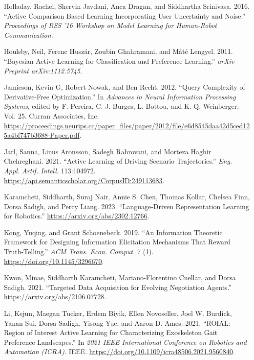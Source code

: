 \documentclass[
  letterpaper,
  numbers=noenddot,
  DIV=11,
  oneside]{scrreprt}
\newlength{\cslhangindent}
\newenvironment{CSLReferences}[2] %
 {\begin{list}{}{%
  \setlength{\itemindent}{0pt}
  \setlength{\leftmargin}{0pt}
  \setlength{\parsep}{0pt}
  \ifodd #1
   \setlength{\leftmargin}{\cslhangindent}
   \setlength{\itemindent}{-1\cslhangindent}
  \fi
  \setlength{\itemsep}{#2\baselineskip}}}
 {\end{list}}
\theoremstyle{remark}
\begin{document}
\begin{CSLReferences}{1}{0}
Holladay, Rachel, Shervin Javdani, Anca Dragan, and Siddhartha
Srinivasa. 2016. {``Active Comparison Based Learning Incorporating User
Uncertainty and Noise.''} \emph{Proceedings of RSS '16 Workshop on Model
Learning for Human-Robot Communication}.

Houlsby, Neil, Ferenc Huszár, Zoubin Ghahramani, and Máté Lengyel. 2011.
{``Bayesian Active Learning for Classification and Preference
Learning.''} \emph{arXiv Preprint arXiv:1112.5745}.

Jamieson, Kevin G, Robert Nowak, and Ben Recht. 2012. {``Query
Complexity of Derivative-Free Optimization.''} In \emph{Advances in
Neural Information Processing Systems}, edited by F. Pereira, C. J.
Burges, L. Bottou, and K. Q. Weinberger. Vol. 25. Curran Associates,
Inc.
\url{https://proceedings.neurips.cc/paper_files/paper/2012/file/e6d8545daa42d5ced125a4bf747b3688-Paper.pdf}.

Jarl, Sanna, Linus Aronsson, Sadegh Rahrovani, and Morteza Haghir
Chehreghani. 2021. {``Active Learning of Driving Scenario
Trajectories.''} \emph{Eng. Appl. Artif. Intell.} 113:104972.
\url{https://api.semanticscholar.org/CorpusID:249113683}.

Karamcheti, Siddharth, Suraj Nair, Annie S. Chen, Thomas Kollar, Chelsea
Finn, Dorsa Sadigh, and Percy Liang. 2023. {``Language-Driven
Representation Learning for Robotics.''}
\url{https://arxiv.org/abs/2302.12766}.

Kong, Yuqing, and Grant Schoenebeck. 2019. {``An Information Theoretic
Framework for Designing Information Elicitation Mechanisms That Reward
Truth-Telling.''} \emph{ACM Trans. Econ. Comput.} 7 (1).
\url{https://doi.org/10.1145/3296670}.

Kwon, Minae, Siddharth Karamcheti, Mariano-Florentino Cuellar, and Dorsa
Sadigh. 2021. {``Targeted Data Acquisition for Evolving Negotiation
Agents.''} \url{https://arxiv.org/abs/2106.07728}.

Li, Kejun, Maegan Tucker, Erdem Biyik, Ellen Novoseller, Joel W.
Burdick, Yanan Sui, Dorsa Sadigh, Yisong Yue, and Aaron D. Ames. 2021.
{``ROIAL: Region of Interest Active Learning for Characterizing
Exoskeleton Gait Preference Landscapes.''} In \emph{2021 IEEE
International Conference on Robotics and Automation (ICRA)}. IEEE.
\url{https://doi.org/10.1109/icra48506.2021.9560840}.


\end{CSLReferences}
\end{document}
